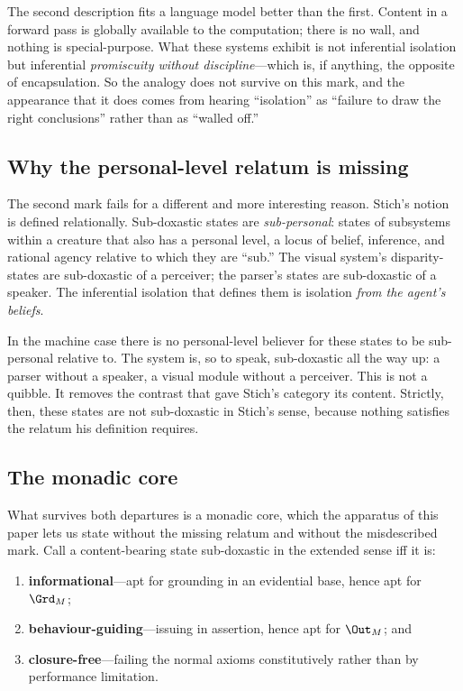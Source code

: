 The second description fits a language model better than the first. Content in a
forward pass is globally available to the computation; there is no wall, and
nothing is special-purpose. What these systems exhibit is not inferential
isolation but inferential \emph{promiscuity without discipline}---which is, if
anything, the opposite of encapsulation. So the analogy does not survive on this
mark, and the appearance that it does comes from hearing ``isolation'' as
``failure to draw the right conclusions'' rather than as ``walled off.''

\subsection{Why the personal-level relatum is missing}
\label{sec:relatum}

The second mark fails for a different and more interesting reason. Stich's notion
is defined relationally. Sub-doxastic states are \emph{sub-personal}: states of
subsystems within a creature that also has a personal level, a locus of belief,
inference, and rational agency relative to which they are ``sub.'' The visual
system's disparity-states are sub-doxastic of a perceiver; the parser's states are
sub-doxastic of a speaker. The inferential isolation that defines them is
isolation \emph{from the agent's beliefs}.

In the machine case there is no personal-level believer for these states to be
sub-personal relative to. The system is, so to speak, sub-doxastic all the way
up: a parser without a speaker, a visual module without a perceiver. This is not
a quibble. It removes the contrast that gave Stich's category its content.
Strictly, then, these states are not sub-doxastic in Stich's sense, because
nothing satisfies the relatum his definition requires.

\subsection{The monadic core}
\label{sec:monadic}

What survives both departures is a monadic core, which the apparatus of this
paper lets us state without the missing relatum and without the misdescribed
mark. Call a content-bearing state sub-doxastic in the extended sense iff it is:

\begin{enumerate}
  \item \textbf{informational}---apt for grounding in an evidential base, hence
        apt for $\Grd_M$;
  \item \textbf{behaviour-guiding}---issuing in assertion, hence apt for
        $\Out_M$; and
  \item \textbf{closure-free}---failing the normal axioms constitutively rather
        than by performance limitation.
\end{enumerate}

